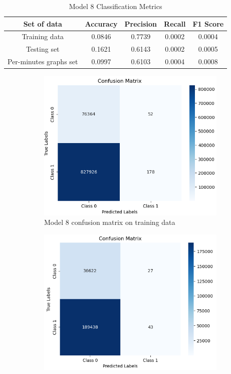 \begin{table}[!ht]
\centering
\begin{tabular}{|c|c|c|c|c|}
\hline
Set of data & Accuracy & Precision & Recall & F1 Score \\
\hline
Training data  & 0.0846 & 0.7739 & 0.0002 & 0.0004 \\
\hline
Testing set  & 0.1621 & 0.6143 & 0.0002 & 0.0005 \\
\hline
Per-minutes graphs set  & 0.0997 & 0.6103 & 0.0004 & 0.0008 \\
\hline
\end{tabular}
\caption{Model 8 Classification Metrics}
\label{M8_tab}
\end{table}
\begin{figure}[H]%
    \centering
    \begin{subfigure}{0.49\textwidth}
        \centering
        \includegraphics[width=\linewidth]{figures/ev/do_4_cm1.png}
        \caption{Model 8 confusion matrix on training data}
    \label{fig:do_4_cm1}
    \end{subfigure}
    \begin{subfigure}{0.49\textwidth}
        \centering
         \includegraphics[width=\linewidth]{figures/ev/do_4_cm2.png}

\end{subfigure}
\end{figure}
